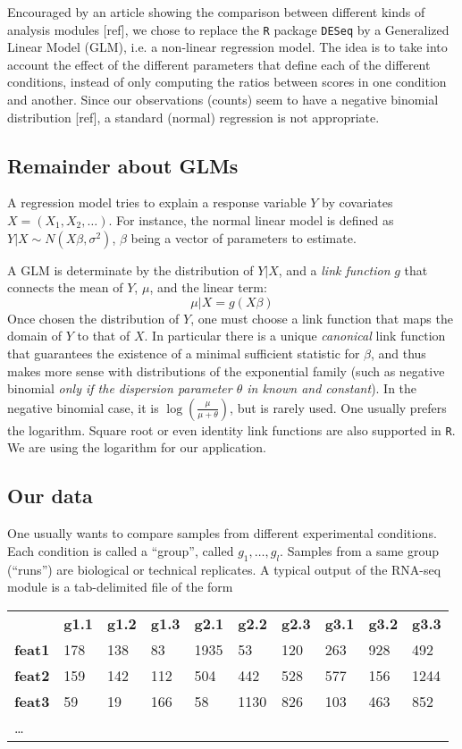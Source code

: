 \documentclass[a4paper,11pt]{article}
\begin{document}
Encouraged by an article showing the comparison between different kinds of analysis modules [ref], we chose to replace the \texttt{R} package \texttt{DESeq} by a Generalized Linear Model (GLM), i.e. a non-linear regression model. The idea is to take into account the effect of the different parameters that define each of the different conditions, instead of only computing the ratios between scores in one condition and another. Since our observations (counts) seem to have a negative binomial distribution [ref], a standard (normal) regression is not appropriate.

\subsection{Remainder about GLMs}
A regression model tries to explain a response variable $Y$ by covariates $X = (X_1,X_2,\ldots)$. For instance, the normal linear model is defined as $Y|X \sim N(X\beta,\sigma^2)$, $\beta$ being a vector of parameters to estimate.

A GLM is determinate by the distribution of $Y|X$, and a \emph{link function} $g$ that connects the mean of $Y$, $\mu$, and the linear term:
$$ \mu|X = g(X\beta) $$
Once chosen the distribution of $Y$, one must choose a link function that maps the domain of $Y$ to that of $X$. In particular there is a unique \emph{canonical} link function that guarantees the existence of a minimal sufficient statistic for $\beta$, and thus makes more sense with distributions of the exponential family (such as negative binomial \emph{only if the dispersion parameter $\theta$ in known and constant}). In the negative binomial case, it is $\log(\frac{\mu}{\mu+\theta})$, but is rarely used. One usually prefers the logarithm. Square root or even identity link functions are also supported in \texttt{R}. We are using the logarithm for our application.

\subsection{Our data}

One usually wants to compare samples from different experimental conditions. Each condition is called a ``group'', called $g_1, \ldots, g_l$. Samples from a same group (``runs'') are biological or technical replicates.
A typical output of the RNA-seq module is a tab-delimited file of the form

\vspace{0.5 cm}
\begin{tabular}{llllllllll}
               & \textbf{g1.1} & \textbf{g1.2} & \textbf{g1.3} & \textbf{g2.1} & \textbf{g2.2} & 
                 \textbf{g2.3} & \textbf{g3.1} & \textbf{g3.2} & \textbf{g3.3} \\
\textbf{feat1} & 178 & 138 & 83 & 1935 & 53 & 120 & 263 & 928 & 492 \\
\textbf{feat2} & 159 & 142 & 112 & 504 & 442 & 528 & 577 & 156 & 1244 \\
\textbf{feat3} & 59 & 19 & 166 & 58 & 1130 & 826 & 103 & 463 & 852 \\
\ldots
\end{tabular}
\vspace{0.5 cm}
\end{document}

